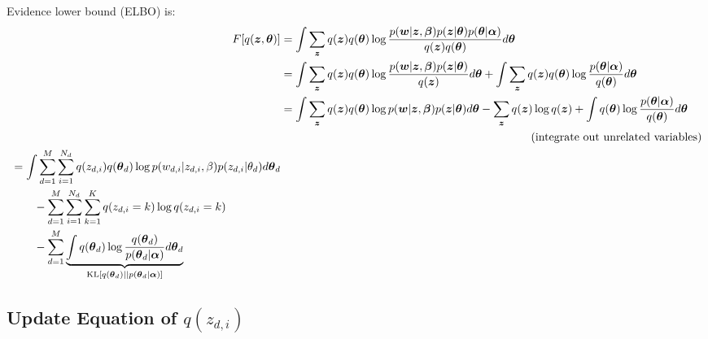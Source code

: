\documentclass[a4paper,10.5pt,dvipdfmx]{jarticle}  %
\begin{document}
Evidence lower bound (ELBO) is:
\begin{align}
	F[q(\boldsymbol{z}, \boldsymbol{\theta})] &= \int \sum_{\boldsymbol{z}} q(\boldsymbol{z}) q(\boldsymbol{\theta}) \log \frac{p(\boldsymbol{w} | \boldsymbol{z}, \boldsymbol{\beta}) p(\boldsymbol{z} | \boldsymbol{\theta}) p(\boldsymbol{\theta} | \boldsymbol{\alpha})}{q(\boldsymbol{z}) q(\boldsymbol{\theta})} d \boldsymbol{\theta}\\
&= \int \sum_{\boldsymbol{z}} q(\boldsymbol{z}) q(\boldsymbol{\theta}) \log \frac{p(\boldsymbol{w} | \boldsymbol{z}, \boldsymbol{\beta}) p(\boldsymbol{z} | \boldsymbol{\theta})}{q(\boldsymbol{z})} d \boldsymbol{\theta} + \int \sum_{\boldsymbol{z}} q(\boldsymbol{z}) q(\boldsymbol{\theta}) \log \frac{p(\boldsymbol{\theta} | \boldsymbol{\alpha})}{q(\boldsymbol{\theta})} d \boldsymbol{\theta} \\
&=\int \sum_{\boldsymbol{z}} q(\boldsymbol{z}) q(\boldsymbol{\theta}) \log p(\boldsymbol{w} | \boldsymbol{z}, \boldsymbol{\beta}) p(\boldsymbol{z} | \boldsymbol{\theta}) d \boldsymbol{\theta} - \sum_{\boldsymbol{z}} q(\boldsymbol{z}) \log q (\boldsymbol{z}) + \int q(\boldsymbol{\theta}) \log \frac{p(\boldsymbol{\theta} | \boldsymbol{\alpha})}{q(\boldsymbol{\theta})} d \boldsymbol{\theta} \\
&\qquad\qquad\qquad\qquad\qquad\qquad\qquad\qquad\qquad\qquad\qquad ({\rm integrate\ out\ unrelated\ variables}) \nonumber \\
\begin{split}
&= \int \sum_{d=1}^{M} \sum_{i=1}^{N_d} q(z_{d,i}) q(\boldsymbol{\theta}_d) \log p(w_{d,i} | z_{d,i}, \beta) p(z_{d,i} | \theta_{d}) d \boldsymbol{\theta}_d\\
&\qquad - \sum_{d=1}^{M} \sum_{i=1}^{N_d} \sum_{k=1}^{K} q(z_{d,i} = k) \log q(z_{d,i} = k)\\
&\qquad - \sum_{d=1}^{M} \underbrace{\int q(\boldsymbol{\theta}_d) \log \frac{q(\boldsymbol{\theta}_d)}{p(\boldsymbol{\theta}_d | \boldsymbol{\alpha})} d \boldsymbol{\theta}_d}_{{\rm KL}\left[ q(\boldsymbol{\theta}_d) || p(\boldsymbol{\theta}_d | \boldsymbol{\alpha}) \right]}
\end{split}
\end{align}

\subsection{Update Equation of $q(z_{d,i})$}
\end{document}
